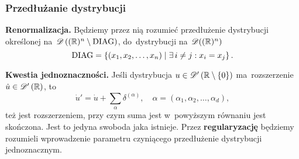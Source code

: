 \documentclass[10pt,t]{beamer}
\begin{document}
\begin{frame}
  \frametitle{Przedłużanie dystrybucji}


  \textbf{Renormalizacja.} Będziemy przez nią rozumieć przedłużenie
  dystrybucji określonej na~$\mathcal{D}\left( ( \mathbb{R} )^{ n } \setminus \textrm{DIAG} \right)$,
  do~dystrybucji na~$\mathcal{D}( ( \mathbb{R} )^{ n } )$
  \begin{equation}
    \label{eq:Epstein-Glaser-02}
    \textrm{DIAG} =
    \left\{ ( x_{ 1 }, x_{ 2 }, \ldots, x_{ n } ) \; | \;
      \exists\, i \neq j : x_{ i } = x_{ j } \right\}.
  \end{equation}

  \vspace{\spaceFour}



  \textbf{Kwestia jednoznaczności.}
  Jeśli dystrybucja $u \in \mathcal{D}'\left( \mathbb{R} \setminus \{ 0 \} \right)$ ma~rozszerzenie
  $\dot{ u } \in \mathcal{D}'\left( \mathbb{R} \right)$, to
  \begin{equation}
    \label{eq:Epstein-Glaser-03}
    \dot{ u }' = \dot{ u } + \sum_{ \alpha } \delta^{ ( \alpha ) }, \quad
    \alpha = ( \alpha_{ 1 }, \alpha_{ 2 }, \ldots, \alpha_{ d } ),
  \end{equation}
  też jest rozszerzeniem, przy czym suma jest w~powyższym równaniu
  jest skończona. Jest to jedyna swoboda jaka istnieje. Przez
  \textbf{regularyzację} będziemy rozumieli wprowadzenie parametru
  czyniącego przedłużenie dystrybucji jednoznacznym.

\end{frame}
\end{document}
